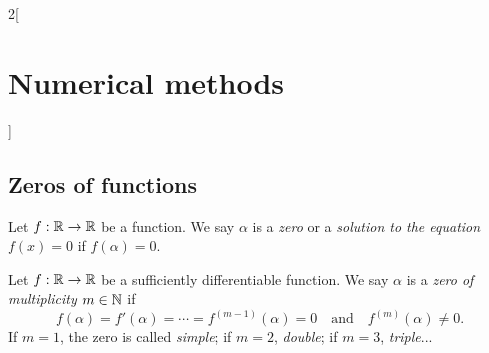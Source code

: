 \documentclass[../../../main.tex]{subfiles}
\begin{document}
\begin{multicols}{2}[\section{Numerical methods}]
\subsection{Zeros of functions}
\begin{definition}
    Let $f:\mathbb{R}\rightarrow\mathbb{R}$ be a function. We say $\alpha$ is a \textit{zero} or a \textit{solution to the equation $f(x)=0$} if $f(\alpha)=0$.
\end{definition}
\begin{definition}
    Let $f:\mathbb{R}\rightarrow\mathbb{R}$ be a sufficiently differentiable function. We say $\alpha$ is a \textit{zero of multiplicity $m\in\mathbb{N}$} if $$f(\alpha)=f'(\alpha)=\cdots=f^{(m-1)}(\alpha)=0\quad\text{and}\quad f^{(m)}(\alpha)\ne0.$$ If $m=1$, the zero is called \textit{simple}; if $m=2$, \textit{double}; if $m=3$, \textit{triple}...
\end{definition}

\end{multicols}
\end{document}
